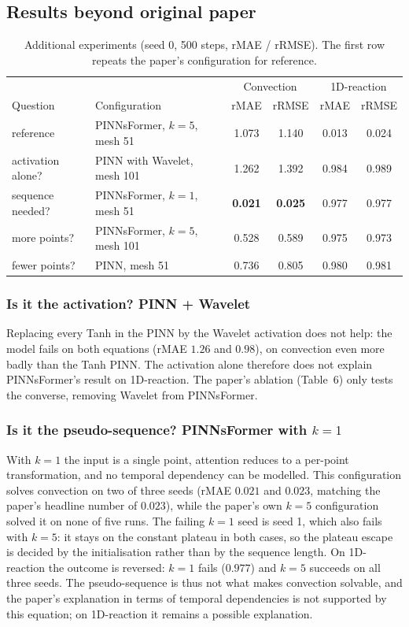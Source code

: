 \documentclass[10pt]{article} %
\begin{document}
\subsection{Results beyond original paper}
\label{sec:beyond}
\begin{table}[ht]
\caption{Additional experiments (seed 0, 500 steps, rMAE / rRMSE). The first row repeats the paper's configuration for reference.}
\label{tab:beyond}
\begin{center}
\small
\begin{tabular}{l l cc cc}
\toprule
 & & \multicolumn{2}{c}{Convection} & \multicolumn{2}{c}{1D-reaction} \\
Question & Configuration & rMAE & rRMSE & rMAE & rRMSE \\
\midrule
reference & PINNsFormer, $k=5$, mesh 51 & 1.073 & 1.140 & 0.013 & 0.024 \\
activation alone? & PINN with Wavelet, mesh 101 & 1.262 & 1.392 & 0.984 & 0.989 \\
sequence needed? & PINNsFormer, $k=1$, mesh 51 & \textbf{0.021} & \textbf{0.025} & 0.977 & 0.977 \\
more points? & PINNsFormer, $k=5$, mesh 101 & 0.528 & 0.589 & 0.975 & 0.973 \\
fewer points? & PINN, mesh 51 & 0.736 & 0.805 & 0.980 & 0.981 \\
\bottomrule
\end{tabular}
\end{center}
\end{table}

\subsubsection{Is it the activation? PINN + Wavelet}
Replacing every Tanh in the PINN by the Wavelet activation does not help: the model fails on both equations (rMAE $1.26$ and $0.98$), on convection even more badly than the Tanh PINN. The activation alone therefore does not explain PINNsFormer's result on 1D-reaction. The paper's ablation (Table~6) only tests the converse, removing Wavelet from PINNsFormer.

\subsubsection{Is it the pseudo-sequence? PINNsFormer with $k=1$}
With $k=1$ the input is a single point, attention reduces to a per-point transformation, and no temporal dependency can be modelled. This configuration solves convection on two of three seeds (rMAE $0.021$ and $0.023$, matching the paper's headline number of $0.023$), while the paper's own $k=5$ configuration solved it on none of five runs. The failing $k=1$ seed is seed 1, which also fails with $k=5$: it stays on the constant plateau in both cases, so the plateau escape is decided by the initialisation rather than by the sequence length. On 1D-reaction the outcome is reversed: $k=1$ fails ($0.977$) and $k=5$ succeeds on all three seeds. The pseudo-sequence is thus not what makes convection solvable, and the paper's explanation in terms of temporal dependencies is not supported by this equation; on 1D-reaction it remains a possible explanation.
\end{document}
